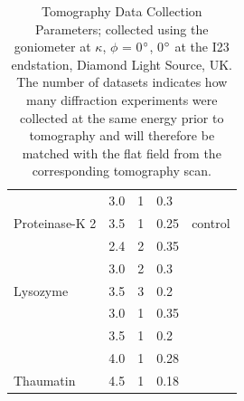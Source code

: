 \begin{table}[h]
{\begin{tabular}{@{}lllll@{}}
                                 & 3.0    & 1             & 0.3                           &                                \\
\multirow{-2}{*}{Proteinase-K 2} & 3.5    & 1             & 0.25                          & \multirow{-2}{*}{control}      \\
                                 & 2.4    & 2             & 0.35                          &                                \\
                                 & 3.0    & 2             & 0.3                           &                                \\
\multirow{-3}{*}{Lysozyme}       & 3.5    & 3             & 0.2                           &                                \\
                                 & 3.0    & 1             & 0.35                          &                                \\
                                 & 3.5    & 1             & 0.2                           &                                \\
                                 & 4.0    & 1             & 0.28                          &                                \\
\multirow{-4}{*}{Thaumatin}      & 4.5    & 1             & 0.18                          &       \\
\bottomrule
\end{tabular}%
}

\caption{Tomography Data Collection Parameters; collected using the goniometer at $\kappa$, $\phi$ = 0$\degree$, 0$\degree$ at the I23 endstation, Diamond Light Source, UK. The number of datasets indicates how many diffraction experiments were collected at the same energy prior to tomography and will therefore be matched with the flat field from the corresponding tomography scan.}
\label{tomo_table}
\end{table}


